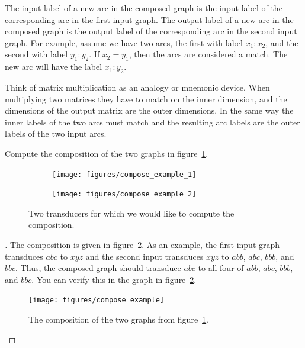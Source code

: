 The input label of a new arc in the composed graph is the input label of the
corresponding arc in the first input graph. The output label of a new arc in
the composed graph is the output label of the corresponding arc in the second
input graph. For example, assume we have two arcs, the first with label
$x_1\!:\!x_2$, and the second with label $y_1\!:\!y_2$. If $x_2 = y_1$, then
the arcs are considered a match. The new arc will have the label $x_1\!:\!y_2$.

Think of matrix multiplication as an analogy or mnemonic device. When
multiplying two matrices they have to match on the inner dimension, and the
dimensions of the output matrix are the outer dimensions. In the same way the
inner labels of the two arcs must match and the resulting arc labels are the
outer labels of the two input arcs.

\begin{example}
Compute the composition of the two graphs in
figure~\ref{fig:compose_example_inputs}.
\end{example}

\begin{figure}
    \centering
    \begin{subfigure}[b]{0.3\textwidth}
        \centering
        \texttt{[image: figures/compose\_example\_1]}
    \end{subfigure}
    \begin{subfigure}[b]{0.68\textwidth}
        \centering
        \texttt{[image: figures/compose\_example\_2]}
    \end{subfigure}
    \caption{Two transducers for which we would like to compute the composition.}
    \label{fig:compose_example_inputs}
\end{figure}

\begin{proof}[\unskip\nopunct]
The composition is given in figure~\ref{fig:compose_example}. As an example,
the first input graph transduces $abc$ to $xyz$ and the second input
transduces $xyz$ to $abb$, $abc$, $bbb$, and $bbc$. Thus, the composed
graph should transduce $abc$ to all four of $abb$, $abc$, $bbb$, and $bbc$.
You can verify this in the graph in figure~\ref{fig:compose_example}.

\begin{figure}
    \centering
    \texttt{[image: figures/compose\_example]}
    \caption{The composition of the two graphs from
    figure~\ref{fig:compose_example_inputs}.}
    \label{fig:compose_example}
\end{figure}

\end{proof}

